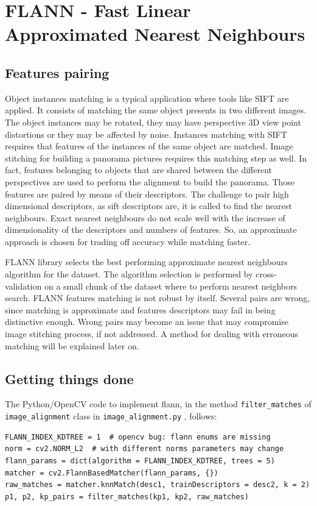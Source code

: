 \documentclass[aps,letterpaper,10pt]{revtex4}
\begin{document}
\section{FLANN - Fast Linear Approximated Nearest Neighbours}
\subsection{Features pairing}
Object instances matching is a typical application where tools like SIFT are applied. It consists of matching the same object presents in two different images. The object instances may be rotated, they may have perspective 3D view point distortions or they may be affected by noise. Instances matching with SIFT requires that features of the instances of the same object are matched. Image stitching for building a panorama pictures requires this matching step as well. In fact, features belonging to objects that are shared between the different perspectives are used to perform the alignment to build the panorama. Those features are paired by means of their descriptors. The challenge to pair high dimensional descriptors, as sift descriptors are, it is called to find the nearest neighbours. Exact nearest neighbours do not scale well with the increase of dimensionality of the descriptors and numbers of features. So, an approximate approach is chosen for trading off accuracy while matching faster. 

FLANN library selects the best performing approximate nearest neighbours algorithm for the dataset. The algorithm selection is performed by cross-validation on a small chunk of the dataset where to perform nearest neighbors search. FLANN features matching is not robust by itself. Several pairs are wrong, since matching is approximate and features descriptors may fail in being distinctive enough. Wrong pairs may become an issue that may compromise image stitching process, if not addressed. A method for dealing with erroneous matching will be explained later on.
\subsection{Getting things done}
The Python/OpenCV code to implement flann, in the method \verb|filter_matches| of \verb|image_alignment| class in \verb|image_alignment.py| , follows: 
\begin{lstlisting}
FLANN_INDEX_KDTREE = 1  # opencv bug: flann enums are missing
norm = cv2.NORM_L2  # with different norms parameters may change 
flann_params = dict(algorithm = FLANN_INDEX_KDTREE, trees = 5)
matcher = cv2.FlannBasedMatcher(flann_params, {})
raw_matches = matcher.knnMatch(desc1, trainDescriptors = desc2, k = 2)
p1, p2, kp_pairs = filter_matches(kp1, kp2, raw_matches)
\end{lstlisting}
\end{document}
